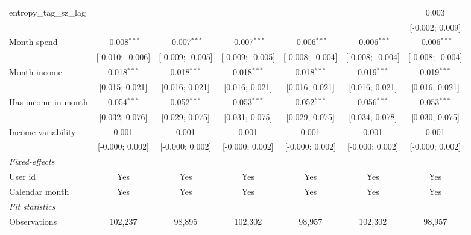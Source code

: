 \begin{table}[htbp]
\begin{threeparttable}[b]
\begin{tabular}{lcccccc}
         entropy\_tag\_sz\_lag            &                  &                  &                  &                  &                  & 0.003\\   
                                          &                  &                  &                  &                  &                  & [-0.002; 0.009]\\   
         Month spend                      & -0.008$^{***}$   & -0.007$^{***}$   & -0.007$^{***}$   & -0.006$^{***}$   & -0.006$^{***}$   & -0.006$^{***}$\\   
                                          & [-0.010; -0.006] & [-0.009; -0.005] & [-0.009; -0.005] & [-0.008; -0.004] & [-0.008; -0.004] & [-0.008; -0.004]\\   
         Month income                     & 0.018$^{***}$    & 0.018$^{***}$    & 0.018$^{***}$    & 0.018$^{***}$    & 0.019$^{***}$    & 0.019$^{***}$\\   
                                          & [0.015; 0.021]   & [0.016; 0.021]   & [0.016; 0.021]   & [0.016; 0.021]   & [0.016; 0.021]   & [0.016; 0.021]\\   
         Has income in month              & 0.054$^{***}$    & 0.052$^{***}$    & 0.053$^{***}$    & 0.052$^{***}$    & 0.056$^{***}$    & 0.053$^{***}$\\   
                                          & [0.032; 0.076]   & [0.029; 0.075]   & [0.031; 0.075]   & [0.029; 0.075]   & [0.034; 0.078]   & [0.030; 0.075]\\   
         Income variability               & 0.001            & 0.001            & 0.001            & 0.001            & 0.001            & 0.001\\   
                                          & [-0.000; 0.002]  & [-0.000; 0.002]  & [-0.000; 0.002]  & [-0.000; 0.002]  & [-0.000; 0.002]  & [-0.000; 0.002]\\   
         \midrule
         \emph{Fixed-effects}\\
         User id                          & Yes              & Yes              & Yes              & Yes              & Yes              & Yes\\  
         Calendar month                   & Yes              & Yes              & Yes              & Yes              & Yes              & Yes\\  
         \midrule
         \emph{Fit statistics}\\
         Observations                     & 102,237          & 98,895           & 102,302          & 98,957           & 102,302          & 98,957\\  

\end{tabular}
\end{threeparttable}
\end{table}
